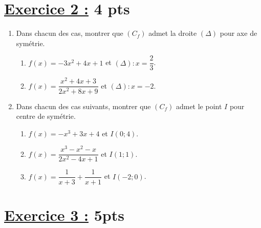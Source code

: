 \documentclass[12pt,a4paper]{article}
\begin{document}
\section*{\underline{Exercice 2 :} 4 pts }

\begin{enumerate}
    \item  Dans chacun des cas, montrer que \( (C_f) \) admet la droite \( (\Delta) \) pour axe de symétrie.

\begin{enumerate}
    \item \( f(x) = -3x^2 + 4x + 1 \) et \( (\Delta) : x = \dfrac{2}{3} \).
    \item \( f(x) = \dfrac{x^2 + 4x + 3}{2x^2 + 8x + 9} \) et \( (\Delta) : x = -2 \).
\end{enumerate}

\item  Dans chacun des cas suivants, montrer que \( (C_f) \) admet le point \( I \) pour centre de symétrie.

\begin{enumerate}
    \item \( f(x) = -x^3 + 3x + 4 \) et \( I(0;4) \).
    \item \( f(x) = \dfrac{x^3 - x^2 - x}{2x^2 - 4x + 1} \) et \( I(1;1) \).
    \item \( f(x) = \dfrac{1}{x+3} + \dfrac{1}{x+1} \) et \( I(-2;0) \).
\end{enumerate}

\end{enumerate}

\section*{\underline{Exercice 3 :} 5pts }
\end{document}
